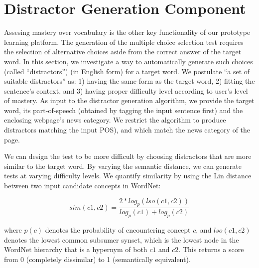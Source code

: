 \section{Distractor Generation Component}
\label{sec:distractor}

Assesing mastery over vocabulary is the other key functionality of our
prototype learning platform.  The generation of the multiple choice
selection test requires the selection of alternative choices aside
from the correct answer of the target word.  In this section, we
investigate a way to automatically generate such choices (called
``distractors'') (in English form) for a target word. We postulate ``a
set of suitable distractors'' as: 1) having the same form as the
target word, 2) fitting the sentence's context, and 3) having proper
difficulty level according to user's level of mastery.
As input to the distractor generation algorithm, we provide the target
word, its part-of-speech (obtained by tagging the input sentence
first) and the enclosing webpage's news category. We restrict the
algorithm to produce distractors matching the input POS), and which
match the news category of the page.


We can design the test to be more difficult by choosing distractors
that are more similar to the target word.  By varying the semantic
distance, we can generate tests at varying difficulty levels.  We
quantify similarity by using the Lin distance~\cite{lin98} between two
input candidate concepts in WordNet:

\begin{equation}
sim(c1,c2) = \frac{2*log_p(lso(c1,c2))}{log_p(c1)+log_p(c2)}
\label{equation:Distractor_4}
\end{equation}  

\noindent where $p(c)$ denotes the probability of encountering concept
$c$, and $lso(c1,c2)$ denotes the lowest common subsumer synset, which
is the lowest node in the WordNet hierarchy that is a hypernym of both
$c1$ and $c2$.  This returns a score from 0 (completely dissimilar) to
1 (semantically equivalent).

